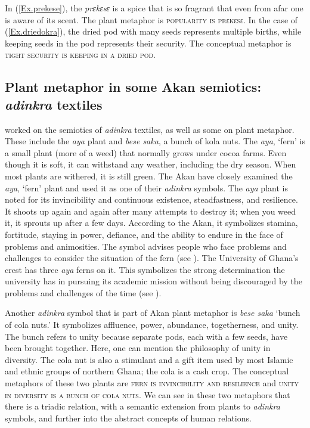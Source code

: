 \documentclass[output=paper,colorlinks,citecolor=brown]{langscibook}
\begin{document}
In (\ref{Ex.prekese}), the \textit{prɛkɛsɛ} is a spice that is so fragrant that even from afar one is aware of its scent. The plant metaphor is \textsc{popularity is prɛkɛsɛ}. In the case of (\ref{Ex.driedokra}), the dried pod with many seeds represents multiple births, while keeping seeds in the pod represents their security. The conceptual metaphor is \textsc{tight security is keeping in a dried pod}.

\subsection{Plant metaphor in some Akan semiotics: \textit{adinkra} textiles}\largerpage

\citet[125--126]{Agyekum2006From} worked on the semiotics of \textit{adinkra} textiles, as well as some on plant metaphor. These include the \textit{aya} plant and \textit{bese saka}, a bunch of kola nuts. The \textit{aya}, `fern’ is a small plant (more of a weed) that normally grows under cocoa farms. Even though it is soft, it can withstand any weather, including the dry season. When most plants are withered, it is still green. The Akan have closely examined the \textit{aya}, `fern’ plant and used it as one of their \textit{adinkra} symbols. The \textit{aya} plant is noted for its invincibility and continuous existence, steadfastness, and resilience. It shoots up again and again after many attempts to destroy it; when you weed it, it sprouts up after a few days. According to the Akan, it symbolizes stamina, fortitude, staying in power, defiance, and the ability to endure in the face of problems and animosities. The symbol advises people who face problems and challenges to consider the situation of the fern (see \cite[125]{Agyekum2006From}). The University of Ghana’s crest has three \textit{aya} ferns on it. This symbolizes the strong determination the university has in pursuing its academic mission without being discouraged by the problems and challenges of the time (see \cite[120]{Opoku1997}).

Another \textit{adinkra} symbol that is part of Akan plant metaphor is \textit{bese saka} `bunch of cola nuts.’ It symbolizes affluence, power, abundance, togetherness, and unity. The bunch refers to unity because separate pods, each with a few seeds, have been brought together. Here, one can mention the philosophy of unity in diversity. The cola nut is also a stimulant and a gift item used by most Islamic and ethnic groups of northern Ghana; the cola is a cash crop. The conceptual metaphors of these two plants are \textsc{fern is invincibility and resilience} and \textsc{unity in diversity is a bunch of cola nuts}. We can see in these two metaphors that there is a triadic relation, with a semantic extension from plants to \textit{adinkra} symbols, and further into the abstract concepts of human relations. 
\end{document}
